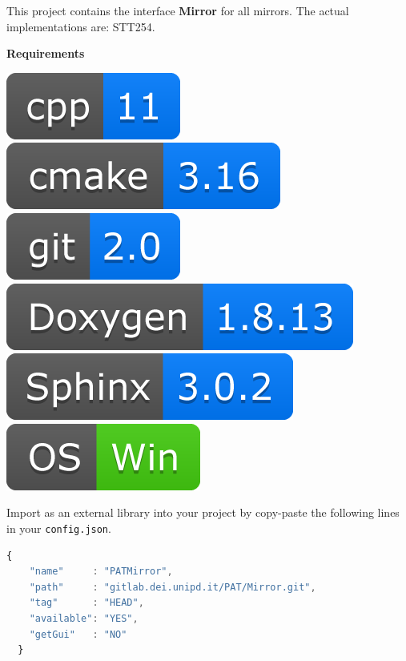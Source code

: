 
This project contains the interface \textbf{Mirror} for all mirrors. The
actual implementations are: STT254.

\textbf{Requirements}

\includegraphics[scale=0.7]{img/shilds/cpp.png}
\includegraphics[scale=0.7]{img/shilds/cmake.png}
\includegraphics[scale=0.7]{img/shilds/git.png}
\includegraphics[scale=0.7]{img/shilds/doxygen.png}
\includegraphics[scale=0.7]{img/shilds/sphinx.png}
\includegraphics[scale=0.7]{img/shilds/win.png}



Import as an external library into your project by copy-paste the
following lines in your \texttt{config.json}.

\begin{lstlisting}[language=javascript, gobble=2]
  {
    "name"     : "PATMirror",
    "path"     : "gitlab.dei.unipd.it/PAT/Mirror.git",
    "tag"      : "HEAD",
    "available": "YES",
    "getGui"   : "NO"
  }
\end{lstlisting}

